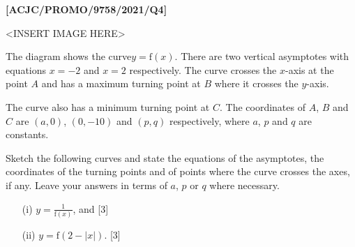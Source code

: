\item \textbf{{[}ACJC/PROMO/9758/2021/Q4{]}}
\noindent \begin{center}
<INSERT IMAGE HERE>
\par\end{center}

The diagram shows the curve$y=\text{f}(x)$. There are two vertical
asymptotes with equations $x=-2$ and $x=2$ respectively. The curve
crosses the $x$-axis at the point $A$ and has a maximum turning
point at $B$ where it crosses the $y$-axis. 

The curve also has a minimum turning point at $C$. The coordinates
of $A$, $B$ and $C$ are $(a,0)$, $(0,-10)$ and $(p,q)$ respectively,
where $a$, $p$ and $q$ are constants. 

Sketch the following curves and state the equations of the asymptotes,
the coordinates of the turning points and of points where the curve
crosses the axes, if any. Leave your answers in terms of $a$, $p$
or $q$ where necessary. 
\begin{enumerate}
\item[(i)]  $y=\frac{1}{\text{f}(x)}$, and \hfill{}{[}3{]}
\item[(ii)]  $y=\text{f}(2-|x|)$. \hfill{}{[}3{]}
\end{enumerate}